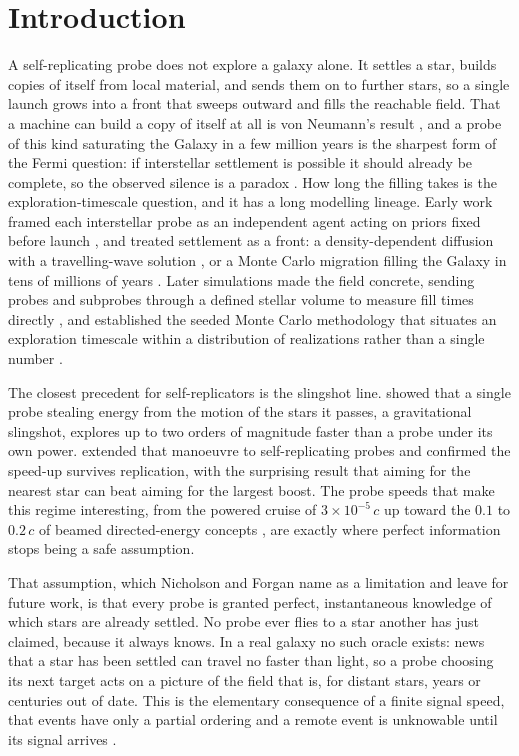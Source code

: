 \section{Introduction}

A self-replicating probe does not explore a galaxy alone. It settles a
star, builds copies of itself from local material, and sends them on to further stars,
so a single launch grows into a front that sweeps outward and fills the reachable field.
That a machine can build a copy of itself at all is von Neumann's result
\citep{von-neumann-burks-1966}, and a probe of
this kind saturating the Galaxy in a few million years is the sharpest form of the Fermi
question: if interstellar settlement is possible it should already be complete, so the
observed silence is a paradox \citep{hart-1975,tipler-1980}. How long the filling takes is
the exploration-timescale question, and it has a long modelling lineage. Early work framed
each interstellar probe as an independent agent acting on priors fixed before launch
\citep{freitas-1980-interstellar-probe}, and treated settlement as a front: a
density-dependent diffusion with a travelling-wave solution \citep{newman-sagan-1981}, or a
Monte Carlo migration filling the Galaxy in tens of millions of years \citep{jones-1981}.
Later simulations made the field concrete, sending probes and subprobes through a defined
stellar volume to measure fill times directly \citep{bjork-2007,cotta-morales-2009}, and
established the seeded Monte Carlo methodology that situates an exploration timescale
within a distribution of realizations rather than a single number \citep{forgan-2009}.

The closest precedent for self-replicators is the slingshot line.
\citet{forgan-papadog-kitching-2013} showed that a single probe stealing energy from the motion of
the stars it passes, a gravitational slingshot, explores up to two orders of magnitude
faster than a probe under its own power. \citet{nicholson-forgan-2013} extended that manoeuvre to
self-replicating probes and confirmed the speed-up survives replication, with the surprising result
that aiming for the nearest star can beat aiming for the largest boost. The probe speeds that make this
regime interesting, from the powered cruise of $3\times10^{-5}\,c$ up toward the $0.1$ to
$0.2\,c$ of beamed directed-energy concepts \citep{lubin-2016}, are exactly where perfect
information stops being a safe assumption.

That assumption, which Nicholson and Forgan name as a limitation and leave for future
work, is that every probe is granted perfect, instantaneous knowledge of which stars are
already settled. No probe ever flies to a star another has just claimed, because it always
knows. In a real galaxy no such oracle exists: news that a star has been settled can
travel no faster than light, so a probe choosing its next target acts on a picture of the
field that is, for distant stars, years or centuries out of date. This is the elementary
consequence of a finite signal speed, that events have only a partial ordering and a
remote event is unknowable until its signal arrives \citep{lamport-1978}.

